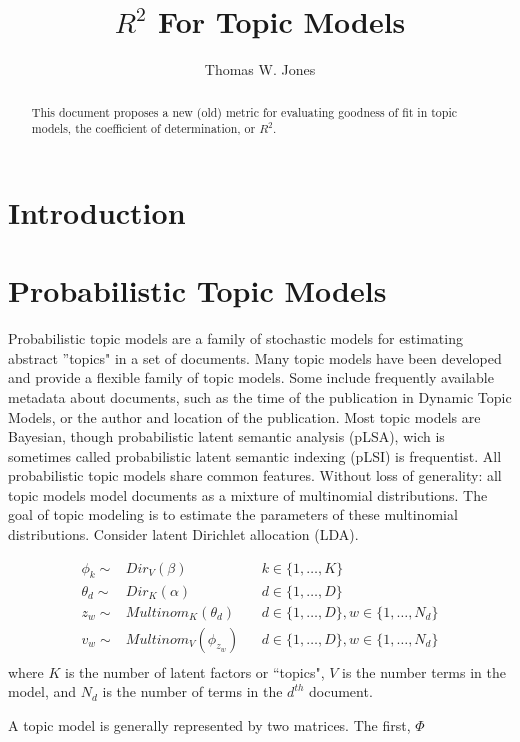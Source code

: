 \documentclass[12pt]{amsart}
\title{$R^2$ For Topic Models}
\author{Thomas W. Jones}
\begin{document}
\maketitle

\begin{abstract}
This document proposes a new (old) metric for evaluating goodness of fit in topic models, the coefficient of determination, or $R^2$.
\end{abstract}

\section{Introduction}

\section{Probabilistic Topic Models}
Probabilistic topic models are a family of stochastic models for estimating abstract ''topics" in a set of documents. Many topic models have been developed and provide a flexible family of topic models. Some include frequently available metadata about documents, such as the time of the publication in Dynamic Topic Models, or the author and location of the publication. Most topic models are Bayesian, though probabilistic latent semantic analysis (pLSA), wich is sometimes called probabilistic latent semantic indexing (pLSI) is frequentist. All probabilistic topic models share common features. Without loss of generality: all topic models model documents as a mixture of multinomial distributions. The goal of topic modeling is to estimate the parameters of these multinomial distributions. Consider latent Dirichlet allocation (LDA). 

\begin{align*}
\phi_k \sim& Dir_V(\beta) && k\in\{1, \ldots, K\} \\
{\theta}_d \sim& Dir_K({\alpha}) && d\in\{1, \ldots, D\}\\
z_w \sim& Multinom_K({\theta}_d) && d\in \{1, \ldots, D\}, w\in\{1,\ldots, N_d\}\\
v_w \sim& Multinom_V({\phi}_{z_w}) && d\in \{1, \ldots, D\}, w\in\{1,\ldots,N_d\}\\
\end{align*} where $K$ is the number of latent factors or ``topics", $V$ is the number terms in the model, and $N_d$ is the number of terms in the $d^{th}$ document. 

A topic model is generally represented by two matrices. The first, $\Phi$ 
\end{document}
